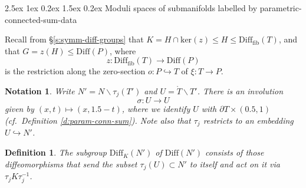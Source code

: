 \documentclass[reqno,a4paper]{article}
\makeatletter
\numberwithin{equation}{section}
\theoremstyle{italicised}
\theoremstyle{upright}
\newtheorem{defn}[thm]{Definition}
\newtheorem{notation}[thm]{Notation}
\theoremstyle{italicised-restate}
\renewcommand*{\subsection}{\@startsection{subsection}{2}{\z@}%
	{2.5ex \@plus 1ex \@minus 0.2ex}%
	{1.5ex \@plus 0.2ex}%
	{\normalfont\normalsize\bfseries}}
\newcommand{\cf}{\textit{cf}.\ }
\renewcommand{\leq}{\leqslant}
\makeatother
\begin{document}
\subsection{Moduli spaces of submanifolds labelled by parametric-connected-sum-data}


Recall from \S\ref{s:symm-diff-groups} that $K = H \cap \mathrm{ker}(z) \leq H \leq \mathrm{Diff}_{\mathrm{fib}}(T)$, and that $G = z(H) \leq \mathrm{Diff}(P)$, where
\[
z \colon \mathrm{Diff}_{\mathrm{fib}}(T) \longrightarrow \mathrm{Diff}(P)
\]
is the restriction along the zero-section $o \colon P \hookrightarrow T$ of $\xi \colon T \to P$.

\begin{notation}\label{not:nprime}
Write $N' = N \smallsetminus \tau_j(T')$ and $U = \mathring{T} \smallsetminus T'$. There is an involution
\[
\sigma \colon U \longrightarrow U
\]
given by $(x,t) \mapsto (x,1.5-t)$, where we identify $U$ with $\partial T \times (0.5,1)$ (\cf Definition \ref{d:param-conn-sum}). Note also that $\tau_j$ restricts to an embedding $U \hookrightarrow N'$.
\end{notation}

\begin{defn}
The subgroup $\mathrm{Diff}_K(N')$ of $\mathrm{Diff}(N')$ consists of those diffeomorphisms that send the subset $\tau_j(U) \subset N'$ to itself and act on it via $\tau_j K \tau_j^{-1}$.
\end{defn}
\end{document}
